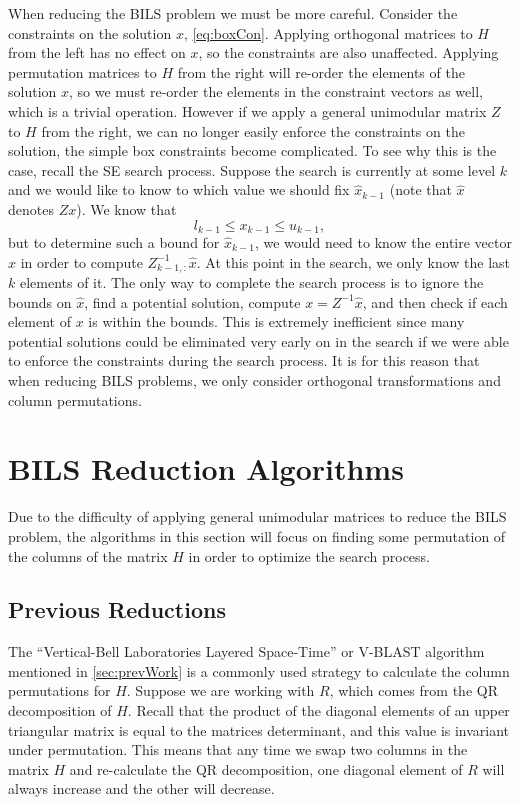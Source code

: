 \documentclass[12pt,Bold,letterpaper]{mcgilletdclass}
\newcommand{\vsp}{\vspace{\baselineskip}}
\begin{document}
When reducing the BILS problem we must be more careful. Consider the constraints on the solution $x$, \eqref{eq:boxCon}. Applying orthogonal matrices to $H$ from the left has no effect on $x$, so the constraints are also unaffected. Applying permutation matrices to $H$ from the right will re-order the elements of the solution $x$, so we must re-order the elements in the constraint vectors as well, which is a trivial operation. However if we apply a general unimodular matrix $Z$ to $H$ from the right, we can no longer easily enforce the constraints on the solution, the simple box constraints become complicated. To see why this is the case, recall the SE search process. Suppose the search is currently at some level $k$ and we would like to know to which value we should fix $\hat{x}_{k-1}$ (note that $\hat{x}$ denotes $Zx$). We know that $$l_{k-1} \le x_{k-1} \le u_{k-1},$$ but to determine such a bound for $\hat{x}_{k-1}$, we would need to know the entire vector $\hat{x}$ in order to compute $Z^{-1}_{k-1,:}\hat{x}$. At this point in the search, we only know the last $k$ elements of it. The only way to complete the search process is to ignore the bounds on $\hat{x}$, find a potential solution, compute $x = Z^{-1}\hat{x}$, and then check if each element of $x$ is within the bounds. This is extremely inefficient since many potential solutions could be eliminated very early on in the search if we were able to enforce the constraints during the search process. It is for this reason that when reducing BILS problems, we only consider orthogonal transformations and column permutations.

\vsp \section{BILS Reduction Algorithms} \label{sec:BILSReduction}

Due to the difficulty of applying general unimodular matrices to reduce the BILS problem, the algorithms in this section will focus on finding some permutation of the columns of the matrix $H$ in order to optimize the search process.

\vsp \subsection{Previous Reductions}

The ``Vertical-Bell Laboratories Layered Space-Time'' or V-BLAST algorithm \cite{FosGVW99} mentioned in \ref{sec:prevWork} is a commonly used strategy to calculate the column permutations for $H$. Suppose we are working with $R$, which comes from the QR decomposition of $H$. Recall that the product of the diagonal elements of an upper triangular matrix is equal to the matrices determinant, and this value is invariant under permutation. This means that any time we swap two columns in the matrix $H$ and re-calculate the QR decomposition, one diagonal element of $R$ will always increase and the other will decrease.
\end{document}
